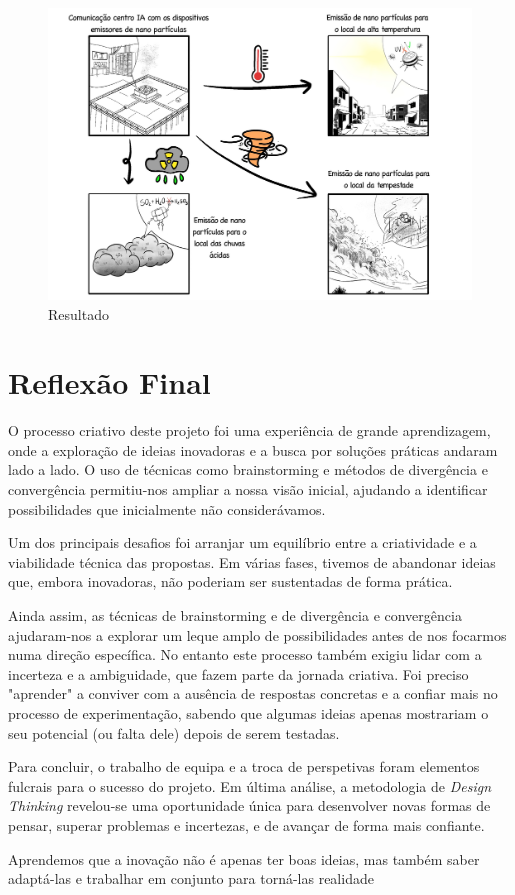 \documentclass[a4paper, 11pt, onecolumn, oneside]{report}
\begin{document}
\begin{figure}[ht]
    \centering
    \includegraphics[scale=0.17]{images/result.jpg}
    \caption{Resultado}
    \label{fig:result}
\end{figure}



\chapter{Reflexão Final}
\label{chap.reflexaoFinal}
O processo criativo deste projeto foi uma experiência de grande aprendizagem, onde a exploração de ideias inovadoras e a busca por soluções práticas andaram lado a lado. O uso de técnicas como brainstorming e métodos de divergência e convergência permitiu-nos ampliar a nossa visão inicial, ajudando a identificar possibilidades que inicialmente não considerávamos.
\par
Um dos principais desafios foi arranjar um equilíbrio entre a criatividade e a viabilidade técnica das propostas. Em várias fases, tivemos de abandonar ideias que, embora inovadoras, não poderiam ser sustentadas de forma prática.
\par
Ainda assim, as técnicas de brainstorming e de divergência e convergência ajudaram-nos a explorar um leque amplo de possibilidades antes de nos focarmos numa direção específica. No entanto este processo também exigiu lidar com a incerteza e a ambiguidade, que fazem parte da jornada criativa. Foi preciso "aprender" a conviver com a ausência de respostas concretas e a confiar mais no processo de experimentação, sabendo que algumas ideias apenas mostrariam o seu potencial (ou falta dele) depois de serem testadas.
\par
Para concluir, o trabalho de equipa e a troca de perspetivas foram elementos fulcrais para o sucesso do projeto. Em última análise, a metodologia de \textit{Design Thinking} revelou-se uma oportunidade única para desenvolver novas formas de pensar, superar problemas e incertezas, e de avançar de forma mais confiante.
\par  
Aprendemos que a inovação não é apenas ter boas ideias, mas também saber adaptá-las e trabalhar em conjunto para torná-las realidade
\end{document}
